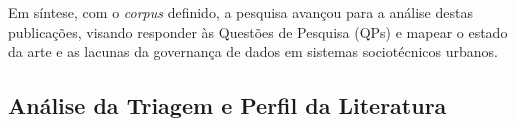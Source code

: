 \documentclass[12pt]{article}
\begin{document}
\begin{table}[H]
\centering
\caption{Resultados da Avaliação de Qualidade (AQ)}
\label{tab:resumo_qualidade}
\small
{}
\end{table}

Em síntese, com o \textit{corpus} definido, a pesquisa avançou para a análise destas publicações, visando responder às Questões de Pesquisa (QPs) e mapear o estado da arte e as lacunas da governança de dados em sistemas sociotécnicos urbanos.

\subsection{Análise da Triagem e Perfil da Literatura}


\end{document}

